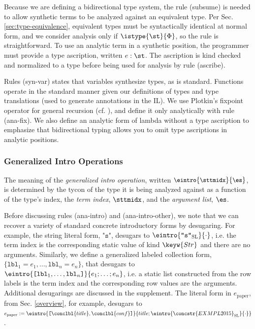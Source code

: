 Because we are defining a bidirectional type system, the rule (subsume) is needed to allow synthetic terms to be analyzed against an equivalent type. Per Sec. \ref{sec:type-equivalence}, equivalent types must be  syntactically identical at normal form, and we consider analysis only if $\istype{\st}{\Phi}$, so the rule is straightforward. To use an analytic term in a synthetic position, the programmer must provide a type ascription, written $e : \st$. The ascription is kind checked and normalized to a type before being used for analysis by rule (ascribe).

Rules (syn-var) states that variables synthesize types, as is standard. Functions operate in the standard manner given our definitions of types and type translations (used to generate annotations in the IL). We use Plotkin's fixpoint operator for general recursion (cf. \cite{pfpl}), and define it only analytically with rule (ana-fix). We also define an analytic form of lambda without a type ascription to emphasize that bidirectional typing allows you to omit type ascriptions in analytic positions.%





\subsubsection{Generalized Intro Operations}\label{sec:introop}
\noindent The meaning of the \emph{generalized intro operation}, written $\small\eintro{\sttmidx}{\es}$, is determined by the tycon of the type it is being analyzed against as a function of the type's index, the \emph{term index}, $\sttmidx$, and the \emph{argument list}, $\es$.

Before discussing rules (ana-intro) and (ana-intro-other), we note that we can recover a variety of standard concrete introductory forms by desugaring. For example, the string literal form, $\texttt{"s"}$, desugars to $\eintro{\texttt{"s"}_\text{SL}}{\cdot}$, i.e. the term index is the corresponding static value of kind $\keyw{Str}$ and there are no arguments. Similarly, we define a generalized labeled collection form, $\{\mathtt{lbl}_1=e_1, \ldots, \mathtt{lbl}_n=e_n\}$, that desugars to $\eintro{\texttt{[}\mathtt{lbl}_1, \ldots, \mathtt{lbl}_n\texttt{]}}{e_1; \ldots; e_n}$, i.e. a static list constructed from the row labels is the term index and the corresponding row values are the arguments. Additional desugarings are discussed in the supplement. The literal form in $e_\text{paper}$, from Sec. \ref{overview}, for example, desugars to $e_\text{paper}:=\eintro{\texttt{[}\conclbl{title}, \conclbl{conf}\texttt{]}}{title; \eintro{\concstr{EXMPL 2015}_\text{SL}}{\cdot}}$. %

